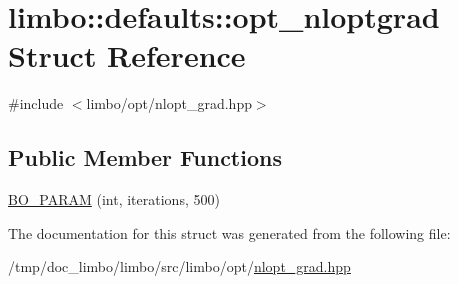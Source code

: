 \hypertarget{structlimbo_1_1defaults_1_1opt__nloptgrad}{}\section{limbo\+:\+:defaults\+:\+:opt\+\_\+nloptgrad Struct Reference}
\label{structlimbo_1_1defaults_1_1opt__nloptgrad}


{\ttfamily \#include $<$limbo/opt/nlopt\+\_\+grad.\+hpp$>$}

\subsection*{Public Member Functions}
\begin{DoxyCompactItemize}
\item 
\hyperlink{group__opt__defaults_ga4b0e251e3b7440148225201bcfc61f26}{B\+O\+\_\+\+P\+A\+R\+A\+M} (int, iterations, 500)
\end{DoxyCompactItemize}


The documentation for this struct was generated from the following file\+:\begin{DoxyCompactItemize}
\item 
/tmp/doc\+\_\+limbo/limbo/src/limbo/opt/\hyperlink{nlopt__grad_8hpp}{nlopt\+\_\+grad.\+hpp}\end{DoxyCompactItemize}
